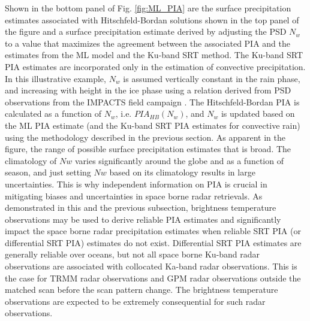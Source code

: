 \documentclass[10pt]{ietbook}
\begin{document}
Shown in the bottom panel of Fig. \ref{fig:ML_PIA} are the surface precipitation estimates associated with Hitschfeld-Bordan solutions shown
in the top panel of the figure and a surface precipitation estimate derived by adjusting the PSD $N_w$ to a value that maximizes the
agreement between the associated PIA and the estimates from the ML model and the Ku-band SRT method. The Ku-band SRT PIA estimates are incorporated
only in the estimation of convective precipitation.  In this illustrative example, $N_w$ is assumed vertically constant in the rain phase,
and increasing with height in the ice phase using a relation derived from PSD observations from the IMPACTS field campaign \cite{impacts2022}.  
The Hitschfeld-Bordan PIA is calculated as a function of $N_w$, i.e. $PIA_{HB}(N_w)$, and
$N_w$ is updated based on the ML PIA estimate (and the Ku-band SRT PIA estimates for convective rain) using the methodology described in the
previous section.  As apparent in the figure, the range of possible surface precipitation estimates that is broad.  The climatology of $Nw$
varies significantly around the globe and as a function of season, and just setting $Nw$ based on its climatology results in large uncertainties.
This is why independent information on PIA is crucial in mitigating biases and uncertainties in space borne radar retrievals. 
As demonstrated in this and the previous subsection, brightness temperature observations may be used to derive reliable PIA estimates and significantly
impact the space borne radar precipitation estimates when reliable SRT PIA (or differential SRT PIA) estimates do not exist.  Differential SRT PIA estimates
are generally reliable over oceans, but not all space borne Ku-band radar observations are associated with collocated Ka-band radar observations.
This is the case for TRMM radar observations and GPM radar observations outside the matched scan before the scan pattern change. The brightness temperature
observations are expected to be extremely consequential for such radar observations.
\end{document}
